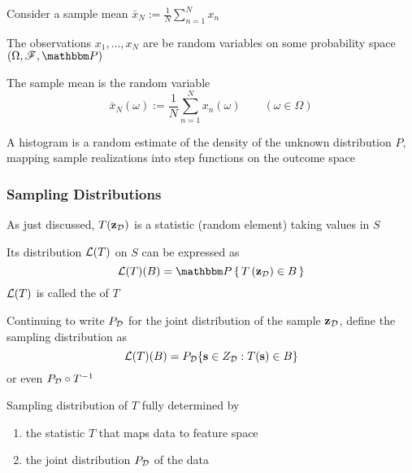 \begin{frame}

    \vspace{2em}
    \Eg
    Consider a sample mean $\bar x_N := \frac{1}{N} \sum_{n=1}^N x_n$
    
    The observations $x_1, \ldots, x_N$ are be random variables
    on some probability space $(\Omega, \fF, \PP)$
    
    The sample mean is the random variable
    \begin{equation*}
        \label{eq:sirv}
        \bar x_N(\omega) := \frac{1}{N} \sum_{n=1}^N x_n(\omega)
        \qquad (\omega \in \Omega)
    \end{equation*}
    
    \vspace{.7em}
    \Eg
        A histogram is a random estimate of the density of the unknown
        distribution $P$, mapping sample realizations into step functions 
        on the outcome space

\end{frame}

\begin{frame}\frametitle{Sampling Distributions}
 
    \vspace{2em}
    As just discussed, $T(\mathbf{z}_{\mathcal D} )$ is a statistic (random element) 
    taking values in $S$
    
    \vspace{.7em}
    Its
    distribution $\mathcal L(T)$ on $S$ can be expressed as
    \begin{equation*}
        \label{eq:dsampdist}
        \lL(T) (B) 
        = \PP   \left\{ \, T \left(\zdata \right) \in B \, \right\}
    \end{equation*}
    $\mathcal L(T)$  is called the  of $T$
    
\end{frame}

\begin{frame}
    
    \vspace{2em}
    Continuing to write $P_{\mathcal D}$ for the joint distribution of the
    sample $\mathbf{z}_{\mathcal D}$, define the sampling distribution as 
    \begin{equation*}
        \mathcal L(T) (B) = P_{\mathcal D}\{ {\mathbf s} \in Z_{\mathcal D} : T({\mathbf s}) \in B \}
    \end{equation*}
    or even $P_{\mathcal D} \circ T^{-1}$ 
    
    \vspace{.7em}
    Sampling distribution of $T$ fully determined by 
    \begin{enumerate}
        \item the statistic $T$ that maps data to feature space
        \item the joint distribution $P_{\mathcal D}$ of the data
    \end{enumerate}
    
\end{frame}

